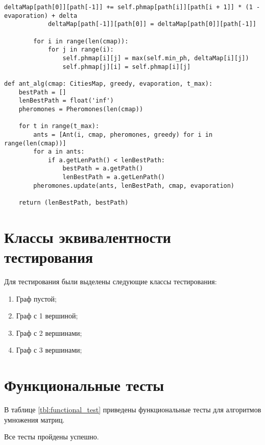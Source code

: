 \begin{center}
\begin{lstlisting}[label=lst:lst2, caption=Реализация муравьиного алгоритма]
			deltaMap[path[0]][path[-1]] += self.phmap[path[i]][path[i + 1]] * (1 - evaporation) + delta
			deltaMap[path[-1]][path[0]] = deltaMap[path[0]][path[-1]]

		for i in range(len(cmap)):
			for j in range(i):
				self.phmap[i][j] = max(self.min_ph, deltaMap[i][j])
				self.phmap[j][i] = self.phmap[i][j]

def ant_alg(cmap: CitiesMap, greedy, evaporation, t_max):
	bestPath = []
	lenBestPath = float('inf')
	pheromones = Pheromones(len(cmap))
	
	for t in range(t_max):
		ants = [Ant(i, cmap, pheromones, greedy) for i in range(len(cmap))]
		for a in ants:
			if a.getLenPath() < lenBestPath:
				bestPath = a.getPath()
				lenBestPath = a.getLenPath()
		pheromones.update(ants, lenBestPath, cmap, evaporation)

	return (lenBestPath, bestPath)
	\end{lstlisting}
\end{center}


\section{Классы эквивалентности тестирования}

Для тестирования были выделены следующие классы тестирования:
\begin{enumerate}
	\item {Граф пустой};
	\item {Граф с 1 вершиной};
	\item {Граф с 2 вершинами};
	\item {Граф с 3 вершинами};
\end{enumerate}

\section{Функциональные тесты}
В таблице \ref{tbl:functional_test} приведены функциональные тесты для алгоритмов умножения матриц.

Все тесты пройдены успешно.

